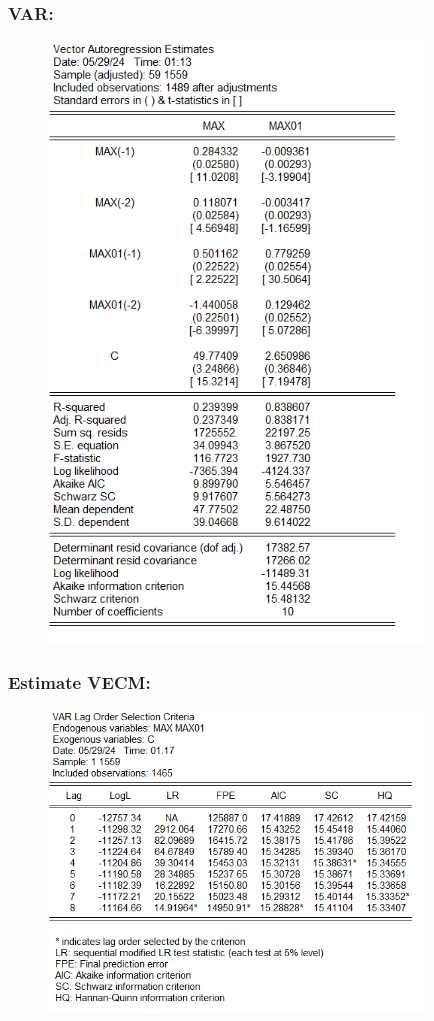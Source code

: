 \documentclass{article} %
\begin{document}
\subsubsection*{VAR:}
\begin{figure}[H]
    \centering
    \includegraphics[width=10cm]{images/image31.png}
\end{figure}

\subsubsection*{Estimate VECM:}
\begin{figure}[H]
    \centering
    \includegraphics[width=10cm]{images/image35.png}
\end{figure}
\end{document}

